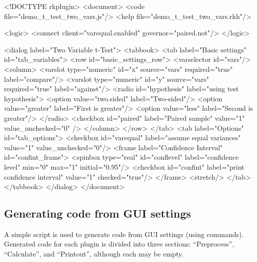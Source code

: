 \begin{footnotesize}
\begin{Code}
<!DOCTYPE rkplugin>
<document>
  <code file="demo_t_test_two_vars.js"/>
  <help file="demo_t_test_two_vars.rkh"/>

  <logic>
    <connect client="varequal.enabled" governor="paired.not"/>
  </logic>

  <dialog label="Two Variable t-Test">
    <tabbook>
      <tab label="Basic settings" id="tab_variables">
        <row id="basic_settings_row">
          <varselector id="vars"/>
          <column>
            <varslot type="numeric" id="x" source="vars" required="true"
              label="compare"/>                                                             
            <varslot type="numeric" id="y" source="vars" required="true"
              label="against"/>
            <radio id="hypothesis" label="using test hypothesis">
              <option value="two.sided" label="Two-sided"/>
              <option value="greater" label="First is greater"/>
              <option value="less" label="Second is greater"/>
            </radio>
            <checkbox id="paired" label="Paired sample" value="1" value_unchecked="0" />
          </column>
        </row>
      </tab>
      <tab label="Options" id="tab_options">
        <checkbox id="varequal" label="assume equal variances" value="1"
          value_unchecked="0"/>
        <frame label="Confidence Interval" id="confint_frame">
          <spinbox type="real" id="conflevel" label="confidence level" min="0" max="1"
            initial="0.95"/>
          <checkbox id="confint" label="print confidence interval" value="1"
            checked="true"/>
        </frame>
        <stretch/>
      </tab>
    </tabbook>
  </dialog>
</document>
\end{Code}
\end{footnotesize}

\subsection[Generating R code from GUI settings]{Generating  code from GUI settings}
\label{sec:generating_r_code_from_ui_settings}
A simple  script is used to generate  code from GUI settings (using  commands). Generated code for each plugin is divided into three sections: ``Preprocess'', ``Calculate'', and ``Printout'', although each
may be empty.

